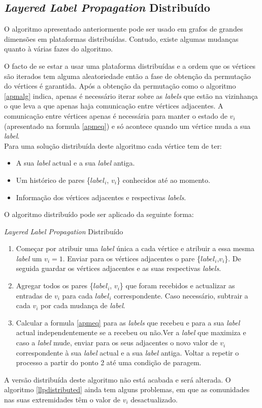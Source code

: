 \newpage
\subsection{\textit{Layered Label Propagation} Distribuído}

O algoritmo apresentado anteriormente pode ser usado em grafos de grandes dimensões em plataformas distribuídas. Contudo, existe algumas mudanças quanto à várias fazes do algoritmo. 

  O facto de se estar a usar uma plataforma distribuídas e a ordem que os vértices são iterados tem alguma aleatoriedade então a fase de obtenção da permutação do vértices é garantida. Após a obtenção da permutação como o algoritmo \ref{apmalg} indica, apenas é necessário iterar sobre as \textit{labels} que estão na vizinhança o que leva a que apenas haja comunicação entre vértices adjacentes. A comunicação entre vértices apenas é necessária para manter o estado de $v_i$ (apresentado na formula \ref{apmeq}) e só acontece quando um vértice muda a sua \textit{label}.
  \\[0,25cm]
  Para uma solução distribuída deste algoritmo cada vértice tem de ter:
  \begin{itemize}
   \item A sua \textit{label} actual e a sua \textit{label} antiga.
   \item Um histórico de pares \{$label_i$, $v_i$\} conhecidos até ao momento.
   \item Informação dos vértices adjacentes e respectivas \textit{labels}. 
  \\[0,25cm]
  \end{itemize}
  
  O algoritmo distribuído pode ser aplicado da seguinte forma:
  \begin{algorithm}[H]
    \caption{\textit{Layered Label Propagation} Distribuído}\label{llpdistributed}
    \begin{enumerate}
      \item Começar por atribuir uma \textit{label} única a cada vértice e atribuir a essa mesma \textit{label} um $v_i=1$. Enviar para os vértices adjacentes o pare \{$label_i$,$v_i$\}. De seguida guardar os vértices adjacentes e as suas respectivas \textit{labels}.
      \item Agregar todos os pares \{$label_i$, $v_i$\} que foram recebidos e actualizar as entradas de $v_i$ para cada $label_i$ correspondente. Caso necessário, subtrair a cada $v_i$ por cada mudança de \textit{label}.
      \item Calcular a formula \ref{apmeq} para as \textit{labels} que recebeu e para a sua \textit{label} actual independentemente se a recebeu ou não.Ver a \textit{label} que maximiza e caso a \textit{label} mude, enviar para os seus adjacentes o novo valor de $v_i$ correspondente à sua \textit{label} actual e a sua \textit{label} antiga. Voltar a repetir o processo a partir do ponto 2 até uma condição de paragem.
    \end{enumerate}
  \end{algorithm}

  A versão distribuída deste algoritmo não está acabada e será alterada. O algoritmo \ref{llpdistributed} ainda tem alguns problemas, em que as comunidades nas suas extremidades têm o valor de $v_i$ desactualizado.
